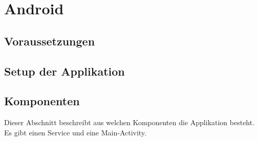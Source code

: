 \section{Android}

\subsection{Voraussetzungen}

\subsection{Setup der Applikation}

\subsection{Komponenten}

Dieser Abschnitt beschreibt aus welchen Komponenten die Applikation besteht. Es gibt einen Service und eine Main-Activity.